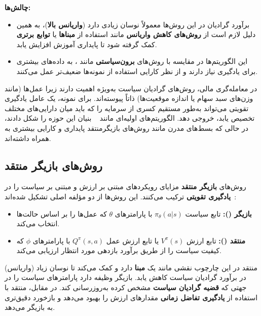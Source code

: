 \documentclass[12pt, a4paper]{report}
\begin{document}
\textbf{چالش‌ها:}
\begin{itemize}
\item برآورد گرادیان در این روش‌ها معمولاً نوسان زیادی دارد (\textbf{واریانس بالا})، به همین دلیل لازم است از \textbf{روش‌های کاهش واریانس} مانند استفاده از \textbf{مبناها} یا \textbf{توابع برتری} کمک گرفته شود تا پایداری آموزش افزایش یابد.  

\item این الگوریتم‌ها در مقایسه با روش‌های \textbf{برون‌سیاستی} مانند ، به داده‌های بیشتری برای یادگیری نیاز دارند و از نظر کارایی استفاده از نمونه‌ها ضعیف‌تر عمل می‌کنند.
\end{itemize}

\bigskip

در معامله‌گری مالی، روش‌های گرادیان سیاست به‌ویژه اهمیت دارند زیرا عمل‌ها (مانند وزن‌های سبد سهام یا اندازه موقعیت‌ها) ذاتاً پیوسته‌اند. برای نمونه، یک عامل یادگیری تقویتی می‌تواند به‌طور مستقیم کسری از سرمایه را که باید میان دارایی‌های مختلف تخصیص یابد، خروجی دهد. الگوریتم‌های اولیه‌ای مانند ~\cite{williams1992simple} بنیان این حوزه را شکل دادند، در حالی که بسط‌های مدرن مانند روش‌های بازیگر\lr{-}منتقد پایداری و کارایی بیشتری به همراه داشته‌اند.  

\subsection{روش‌های بازیگر \lr{-} منتقد\protect\footnotemark}

روش‌های \textbf{بازیگر \lr{-} منتقد} مزایای رویکردهای مبتنی بر ارزش و مبتنی بر سیاست را در \textbf{یادگیری تقویتی} ترکیب می‌کنند. این روش‌ها از دو مؤلفه اصلی تشکیل شده‌اند~\cite{konda2000actor}:  

\begin{itemize}
    \item \textbf{بازیگر ():} تابع سیاست $\pi_{\theta}(a|s)$ با پارامترهای $\theta$ که عمل‌ها را بر اساس حالت‌ها انتخاب می‌کند.
    \item \textbf{منتقد ():} تابع ارزش $V^{\pi}(s)$ یا تابع ارزش عمل $Q^{\pi}(s,a)$ با پارامترهای $\phi$ که کیفیت سیاست را از طریق برآورد بازدهی مورد انتظار ارزیابی می‌کند.
\end{itemize}

منتقد در این چارچوب نقشی مانند یک \textbf{مبنا} دارد و کمک می‌کند تا نوسان زیاد (واریانس) در برآورد گرادیان سیاست کاهش یابد. بازیگر وظیفه دارد پارامترهای سیاست را در جهتی که \textbf{قضیه گرادیان سیاست} مشخص کرده به‌روزرسانی کند. در مقابل، منتقد با استفاده از \textbf{یادگیری تفاضل زمانی} مقدارهای ارزش را بهبود می‌دهد و بازخورد دقیق‌تری به بازیگر می‌دهد.  
\end{document}
